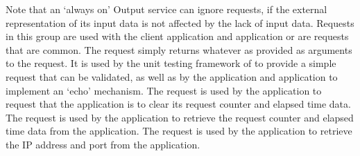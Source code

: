 Note that an `always on' Output service can ignore
 requests, if the external
representation of its input data is not affected by the lack of input data.
\secondaryEnd{}
Requests in this group are used with the  client
application and  application or are requests that
are common.
The  request simply returns whatever
as provided as arguments to the request.
It is used by the unit testing framework of \mplusm{} to provide a simple request that
can be validated, as well as by the  application
and  application to implement an `echo' mechanism.
The  request is used by the
 application to request that the
 application is to clear its request counter and
elapsed time data.
The  request is used by the
 application to retrieve the request counter and
elapsed time data from the  application.
The  request is used by the
 application to retrieve the IP address and port from the
 application.
\secondaryEnd{}
\primaryEnd{}
